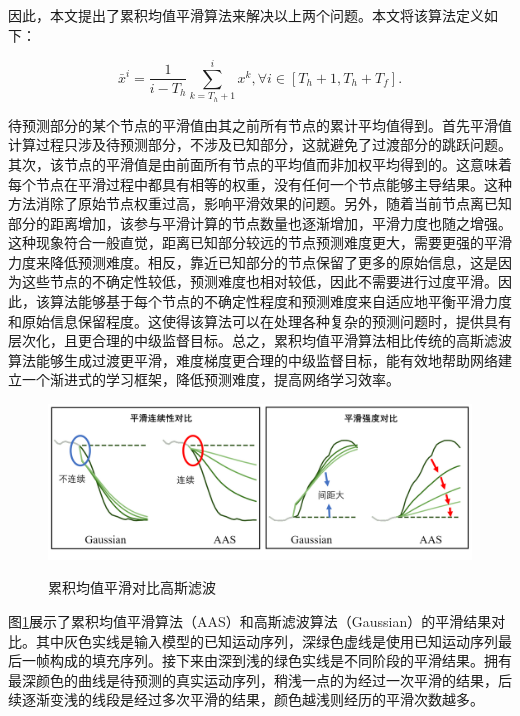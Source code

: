 因此，本文提出了累积均值平滑算法来解决以上两个问题。本文将该算法定义如下：

\begin{equation}
    \bar{x}^i = \frac{1}{i-T_h}\sum_{k=T_h+1}^{i}x^k, \forall i\in[T_h+1, T_h+T_f].
    \label{equation:AAS}
\end{equation}

待预测部分的某个节点的平滑值由其之前所有节点的累计平均值得到。首先平滑值计算过程只涉及待预测部分，不涉及已知部分，这就避免了过渡部分的跳跃问题。其次，该节点的平滑值是由前面所有节点的平均值而非加权平均得到的。这意味着每个节点在平滑过程中都具有相等的权重，没有任何一个节点能够主导结果。这种方法消除了原始节点权重过高，影响平滑效果的问题。另外，随着当前节点离已知部分的距离增加，该参与平滑计算的节点数量也逐渐增加，平滑力度也随之增强。这种现象符合一般直觉，距离已知部分较远的节点预测难度更大，需要更强的平滑力度来降低预测难度。相反，靠近已知部分的节点保留了更多的原始信息，这是因为这些节点的不确定性较低，预测难度也相对较低，因此不需要进行过度平滑。因此，该算法能够基于每个节点的不确定性程度和预测难度来自适应地平衡平滑力度和原始信息保留程度。这使得该算法可以在处理各种复杂的预测问题时，提供具有层次化，且更合理的中级监督目标。总之，累积均值平滑算法相比传统的高斯滤波算法能够生成过渡更平滑，难度梯度更合理的中级监督目标，能有效地帮助网络建立一个渐进式的学习框架，降低预测难度，提高网络学习效率。

\begin{figure}[ht]
    \centering
    \includegraphics[width=1\textwidth]{FigMa/AAS.png}\\
    \vspace{-0.3cm}
    \caption{累积均值平滑对比高斯滤波}
    \label{fig:AAS}
\end{figure}
图\ref{fig:AAS}展示了累积均值平滑算法（AAS）和高斯滤波算法（Gaussian）的平滑结果对比。其中灰色实线是输入模型的已知运动序列，深绿色虚线是使用已知运动序列最后一帧构成的填充序列。接下来由深到浅的绿色实线是不同阶段的平滑结果。拥有最深颜色的曲线是待预测的真实运动序列，稍浅一点的为经过一次平滑的结果，后续逐渐变浅的线段是经过多次平滑的结果，颜色越浅则经历的平滑次数越多。

